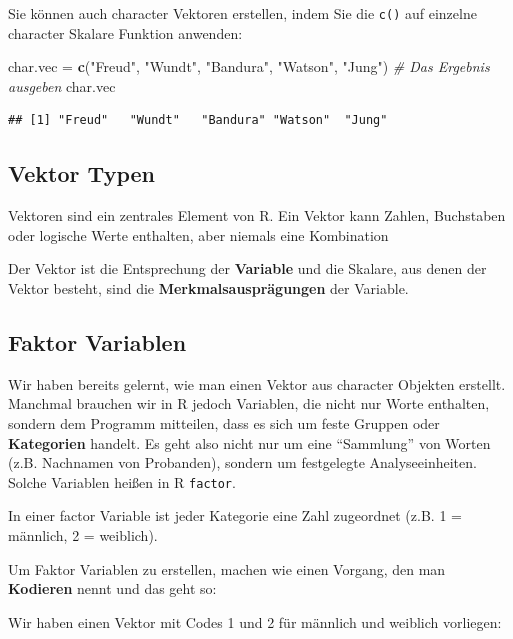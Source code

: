 \documentclass[
]{book}
\newenvironment{Shaded}{\begin{snugshade}}{\end{snugshade}}
\newcommand{\CommentTok}[1]{\textcolor[rgb]{0.56,0.35,0.01}{\textit{#1}}}
\newcommand{\FunctionTok}[1]{\textcolor[rgb]{0.13,0.29,0.53}{\textbf{#1}}}
\newcommand{\NormalTok}[1]{#1}
\newcommand{\OtherTok}[1]{\textcolor[rgb]{0.56,0.35,0.01}{#1}}
\newcommand{\StringTok}[1]{\textcolor[rgb]{0.31,0.60,0.02}{#1}}
\begin{document}
Sie können auch character Vektoren erstellen, indem Sie die \texttt{c()} auf einzelne character Skalare Funktion anwenden:

\begin{Shaded}
\begin{Highlighting}[]
\NormalTok{char.vec }\OtherTok{=} \FunctionTok{c}\NormalTok{(}\StringTok{"Freud"}\NormalTok{, }\StringTok{"Wundt"}\NormalTok{, }\StringTok{"Bandura"}\NormalTok{, }\StringTok{"Watson"}\NormalTok{, }\StringTok{"Jung"}\NormalTok{)}
\CommentTok{\# Das Ergebnis ausgeben}
\NormalTok{char.vec}
\end{Highlighting}
\end{Shaded}

\begin{verbatim}
## [1] "Freud"   "Wundt"   "Bandura" "Watson"  "Jung"
\end{verbatim}

\subsection{Vektor Typen}\label{vektor-typen}

Vektoren sind ein zentrales Element von R. Ein Vektor kann Zahlen, Buchstaben oder logische Werte enthalten, aber niemals eine Kombination

Der Vektor ist die Entsprechung der \textbf{Variable} und die Skalare, aus denen der Vektor besteht, sind die \textbf{Merkmalsausprägungen} der Variable.

\subsection{Faktor Variablen}\label{faktor-variablen}

Wir haben bereits gelernt, wie man einen Vektor aus character Objekten erstellt. Manchmal brauchen wir in R jedoch Variablen, die nicht nur Worte enthalten, sondern dem Programm mitteilen, dass es sich um feste Gruppen oder \textbf{Kategorien} handelt. Es geht also nicht nur um eine ``Sammlung'' von Worten (z.B. Nachnamen von Probanden), sondern um festgelegte Analyseeinheiten. Solche Variablen heißen in R \texttt{factor}.

In einer factor Variable ist jeder Kategorie eine Zahl zugeordnet (z.B. 1 = männlich, 2 = weiblich).

Um Faktor Variablen zu erstellen, machen wie einen Vorgang, den man \textbf{Kodieren} nennt und das geht so:

Wir haben einen Vektor mit Codes 1 und 2 für männlich und weiblich vorliegen:
\end{document}
